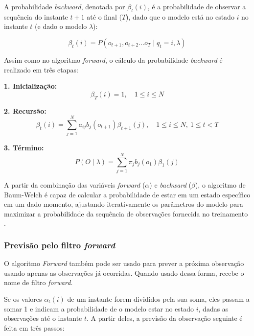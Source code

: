 \documentclass[
    12pt,                %
    openright,           %
    oneside,             %
    a4paper,             %
    english,             %
    brazil               %
]{abntex2}
\begin{document}
A probabilidade \textit{backward}, denotada por $\beta_t(i)$, é a probabilidade de observar a sequência do instante $t+1$ até o final ($T$), dado que o 
modelo está no estado $i$ no instante $t$ (e dado o modelo $\lambda$):

\begin{equation}
    \beta_t(i) = P(o_{t+1}, o_{t+2} \dots o_T \mid q_t = i, \lambda)
    \label{eq:probabilidade_backward}
\end{equation}

Assim como no algoritmo \textit{forward}, o cálculo da probabilidade \textit{backward} é realizado em três etapas:

\textbf{1. Inicialização:}
\begin{equation}
    \beta_T(i) = 1, \quad 1 \le i \le N
    \label{eq:inicializacao_backward}
\end{equation}

\textbf{2. Recursão:}
\begin{equation}
    \beta_t(i) = \sum_{j=1}^N a_{ij} b_j(o_{t+1}) \beta_{t+1}(j), \quad 1 \le i \le N, \ 1 \le t < T
    \label{eq:recursao_backward}
\end{equation}

\textbf{3. Término:}
\begin{equation}
    P(O \mid \lambda) = \sum_{j=1}^N \pi_j b_j(o_1) \beta_1(j)
    \label{eq:termino_backward}
\end{equation}

A partir da combinação das variáveis \textit{forward} ($\alpha$) e \textit{backward} ($\beta$), o algoritmo de Baum-Welch é capaz de calcular a 
probabilidade de estar em um estado específico em um dado momento, ajustando iterativamente os parâmetros do modelo para maximizar a probabilidade da 
sequência de observações fornecida no treinamento \cite{jm3}.

\subsubsection{Previsão pelo filtro \textit{forward}}
\label{sec:filtro_forward}

O algoritmo \textit{Forward} também pode ser usado para prever a próxima observação 
usando apenas as observações já ocorridas. Quando usado dessa forma, recebe o nome de filtro \textit{forward}.

Se os valores $\alpha_t(i)$ de um instante forem divididos pela sua soma, eles passam a somar 1 e indicam a probabilidade de o modelo estar no estado $i$, 
dadas as observações até o instante $t$. A partir deles, a previsão da observação seguinte é feita em três passos:
\end{document}

